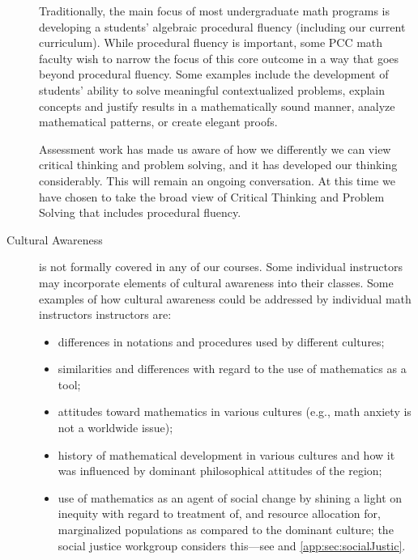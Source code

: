 \begin{description}
Traditionally, the main focus of most undergraduate math programs is developing
a students' algebraic procedural fluency (including our current curriculum).
While procedural fluency is important, some PCC math faculty wish to narrow the
focus of this core outcome in a way that goes beyond procedural fluency. Some
examples include the development of students' ability to solve meaningful
contextualized problems, explain concepts and justify results in a
mathematically sound manner, analyze mathematical patterns, or create elegant
proofs. 

Assessment work has made us aware of how we differently we can view critical
thinking and problem solving, and it has developed our thinking considerably.
This will remain an ongoing conversation. At this time we have chosen to take
the broad view of Critical Thinking and Problem Solving that includes
procedural fluency. 

\item[Cultural Awareness] is not formally covered in any of our courses.  Some
  individual instructors may incorporate elements of cultural awareness into
  their classes.  Some examples of how cultural awareness could be addressed by
  individual math instructors instructors are: 
\begin{itemize}
\item differences in notations and procedures used by different cultures;
\item similarities and differences with regard to the use of mathematics as a
  tool;
\item attitudes toward mathematics in various cultures (e.g., math anxiety is
  not a worldwide issue);
\item history of mathematical  development in various cultures and how it was
  influenced by dominant philosophical attitudes of the region;
\item use of mathematics as an agent of social change by shining a light on
  inequity with regard to treatment of, and resource allocation for,
  marginalized populations as compared to the dominant culture; the social
  justice workgroup considers this---see  and
  \vref{app:sec:socialJustic}. 
\end{itemize}


\end{description}
